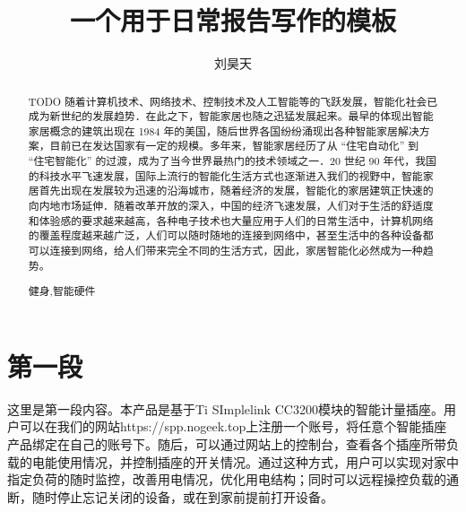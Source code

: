 \documentclass[a4paper,12pt]{article}
\title{一个用于日常报告写作的模板}
\author{刘昊天}
\begin{document}
    \begin{abstract}
    TODO
        随着计算机技术、网络技术、控制技术及人工智能等的飞跃发展，智能化社会已成为新世纪的发展趋势．在此之下，智能家居也随之迅猛发展起来。最早的体现出智能家居概念的建筑出现在 1984 年的美国，随后世界各国纷纷涌现出各种智能家居解决方案，目前已在发达国家有一定的规模。多年来，智能家居经历了从 “住宅自动化” 到 “住宅智能化” 的过渡，成为了当今世界最热门的技术领域之一．20 世纪 90 年代，我国的科技水平飞速发展，国际上流行的智能化生活方式也逐渐进入我们的视野中，智能家居首先出现在发展较为迅速的沿海城市，随着经济的发展，智能化的家居建筑正快速的向内地市场延伸．随着改革开放的深入，中国的经济飞速发展，人们对于生活的舒适度和体验感的要求越来越高，各种电子技术也大量应用于人们的日常生活中，计算机网络的覆盖程度越来越广泛，人们可以随时随地的连接到网络中，甚至生活中的各种设备都可以连接到网络，给人们带来完全不同的生活方式，因此，家居智能化必然成为一种趋势。
        \begin{keywords}
            健身,智能硬件
        \end{keywords}
    \end{abstract}
    \maketitle
    \section{第一段} %
    \label{sec:第一段}
    这里是第一段内容。本产品是基于Ti SImplelink CC3200模块的智能计量插座。用户可以在我们的网站https://spp.nogeek.top上注册一个账号，将任意个智能插座产品绑定在自己的账号下。随后，可以通过网站上的控制台，查看各个插座所带负载的电能使用情况，并控制插座的开关情况。通过这种方式，用户可以实现对家中指定负荷的随时监控，改善用电情况，优化用电结构；同时可以远程操控负载的通断，随时停止忘记关闭的设备，或在到家前提前打开设备。
    \label{applastpage}
    \newpage
    
    
\iffalse
\begin{itemize}[noitemsep,topsep=0pt]
\end{itemize}
\begin{enumerate}[label=\Roman{*}.,noitemsep,topsep=0pt]
\end{enumerate}
\begin{multicols}{2}
\end{multicols}
\fi
\end{document}

